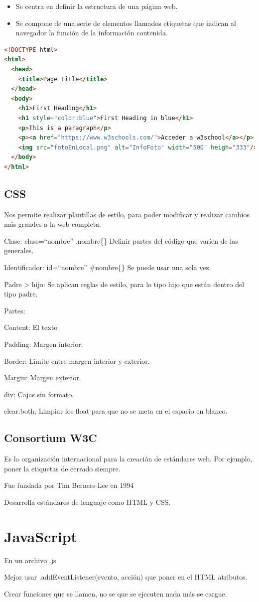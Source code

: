 \documentclass[12pt, twoside, openright]{report} %
\begin{document}
  \begin{itemize}
  
  \item
    Se centra en definir la estructura de una página web.
  \item
    Se compone de una serie de elementos llamados etiquetas que indican
    al navegador la función de la información contenida.
  \end{itemize}
\pagebreak
\begin{lstlisting}[language=HTML]
<!DOCTYPE html>
<html>
  <head>
    <title>Page Title</title>
  </head>
  <body>
    <h1>First Heading</h1>
    <h1 style="color:blue">First Heading in blue</h1>
    <p>This is a paragraph</p>
    <p><a href="https://www.w3schools.com/">Acceder a w3school</a></p>
    <img src="fotoEnLocal.png" alt="InfoFoto" width="500" heigh="333"/>
  </body>
</html>
\end{lstlisting}

\section{CSS}

  Nos permite realizar plantillas de estilo, para poder modificar y
  realizar cambios más grandes a la web completa.

  Clase: class=``nombre'' .nombre\{\} Definir partes del código que
  varíen de las generales.

  Identificador: id=``nombre'' \#nombre\{\} Se puede usar una sola vez.

  Padre \textgreater{} hijo: Se aplican reglas de estilo, para lo tipo
  hijo que están dentro del tipo padre.

  Partes:

  Content: El texto

  Padding: Margen interior.

  Border: Límite entre margen interior y exterior.

  Margin: Margen exterior.

  div: Cajas sin formato.

  clear:both; Limpiar los float para que no se meta en el espacio en
  blanco.

\section{Consortium W3C}

    Es la organización internacional para la creación de estándares web.
    Por ejemplo, poner la etiquetas de cerrado siempre.

    Fue fundada por Tim Berners-Lee en 1994

    Desarrolla estándares de lenguaje como HTML y CSS.

\chapter{JavaScript}

  En un archivo .js

  Mejor usar .addEventListener(evento, acción) que poner en el HTML
  atributos.

  Crear funciones que se llamen, no se que se ejecuten nada más se
  cargue.
\end{document}

